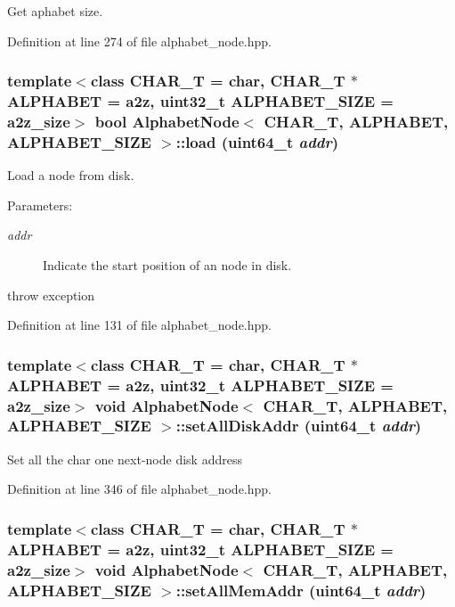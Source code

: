 Get aphabet size. 

Definition at line 274 of file alphabet\_\-node.hpp.\hypertarget{classAlphabetNode_9ddd0b5d2cf28d758dcac0d1b0e0d297}{
\subsubsection[{load}]{\setlength{\rightskip}{0pt plus 5cm}template$<$class CHAR\_\-T  = char, CHAR\_\-T $\ast$ ALPHABET = a2z, uint32\_\-t ALPHABET\_\-SIZE = a2z\_\-size$>$ bool {\bf AlphabetNode}$<$ CHAR\_\-T, ALPHABET, ALPHABET\_\-SIZE $>$::load (uint64\_\-t {\em addr})}}
\label{classAlphabetNode_9ddd0b5d2cf28d758dcac0d1b0e0d297}


Load a node from disk. \begin{Desc}
\item[Parameters:]
\begin{description}
\item[{\em addr}]Indicate the start position of an node in disk. \end{description}
\end{Desc}


throw exception 

Definition at line 131 of file alphabet\_\-node.hpp.\hypertarget{classAlphabetNode_2fddf599d2d1f4f186a42436832cb428}{
\subsubsection[{setAllDiskAddr}]{\setlength{\rightskip}{0pt plus 5cm}template$<$class CHAR\_\-T  = char, CHAR\_\-T $\ast$ ALPHABET = a2z, uint32\_\-t ALPHABET\_\-SIZE = a2z\_\-size$>$ void {\bf AlphabetNode}$<$ CHAR\_\-T, ALPHABET, ALPHABET\_\-SIZE $>$::setAllDiskAddr (uint64\_\-t {\em addr})}}
\label{classAlphabetNode_2fddf599d2d1f4f186a42436832cb428}


Set all the char one next-node disk address 

Definition at line 346 of file alphabet\_\-node.hpp.\hypertarget{classAlphabetNode_bc6a84a232a8f7aef8773c9c24fa458c}{
\subsubsection[{setAllMemAddr}]{\setlength{\rightskip}{0pt plus 5cm}template$<$class CHAR\_\-T  = char, CHAR\_\-T $\ast$ ALPHABET = a2z, uint32\_\-t ALPHABET\_\-SIZE = a2z\_\-size$>$ void {\bf AlphabetNode}$<$ CHAR\_\-T, ALPHABET, ALPHABET\_\-SIZE $>$::setAllMemAddr (uint64\_\-t {\em addr})}}
\label{classAlphabetNode_bc6a84a232a8f7aef8773c9c24fa458c}


